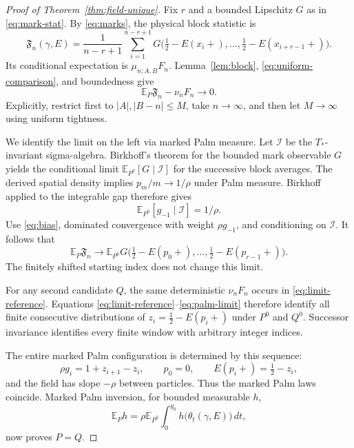 \documentclass[11pt,reqno]{amsart}
\theoremstyle{definition}
\theoremstyle{remark}
\newcommand{\E}{\mathbb E}
\newcommand{\1}{\mathbf 1}
\newcommand{\dd}{\,d}
\numberwithin{equation}{section}
\begin{document}
\begin{proof}[Proof of Theorem~\ref{thm:field-unique}]
Fix $r$ and a bounded Lipschitz $G$ as in \eqref{eq:mark-stat}.
By \eqref{eq:marks}, the physical block statistic is
\[
 \mathfrak F_n(\gamma,E)=\frac1{n-r+1}\sum_{i=1}^{n-r+1}
 G\big(\tfrac12-E(x_i+),\ldots,
       \tfrac12-E(x_{i+r-1}+ )\big).
\]
Its conditional expectation is $\mu_{n;A,B}F_n$.
Lemma~\ref{lem:block}, \eqref{eq:uniform-comparison}, and boundedness
give
\begin{equation}\label{eq:limit-reference}
 \E_P\mathfrak F_n-\nu_nF_n\longrightarrow0.
\end{equation}
Explicitly, restrict first to $|A|,|B-n|\le M$, take $n\to\infty$,
and then let $M\to\infty$ using uniform tightness.

We identify the limit on the left via marked Palm measure. Let
$\mathcal I$ be the $T_*$-invariant sigma-algebra. Birkhoff's theorem
for the bounded mark observable $G$ yields the conditional limit
$\E_{P^0}[G\mid\mathcal I]$ for the successive block averages.
The derived spatial density implies $p_m/m\to1/\rho$ under Palm
measure. Birkhoff applied to the integrable gap therefore gives
\[
 \E_{P^0}[g_{-1}\mid\mathcal I]=1/\rho.
\]
Use \eqref{eq:bias}, dominated convergence with weight $\rho g_{-1}$,
and conditioning on $\mathcal I$. It follows that
\begin{equation}\label{eq:palm-limit}
 \E_P\mathfrak F_n\longrightarrow
 \E_{P^0}G\big(\tfrac12-E(p_0+),\ldots,
              \tfrac12-E(p_{r-1}+ )\big).
\end{equation}
The finitely shifted starting index does not change this limit.

For any second candidate $Q$, the same deterministic $\nu_nF_n$ occurs
in \eqref{eq:limit-reference}. Equations
\eqref{eq:limit-reference}--\eqref{eq:palm-limit} therefore identify
all finite consecutive distributions of
$z_i=\tfrac12-E(p_i+)$ under $P^0$ and $Q^0$. Successor invariance
identifies every finite window with arbitrary integer indices.

The entire marked Palm configuration is determined by this sequence:
\begin{equation}\label{eq:reconstruct}
 \rho g_i=1+z_{i+1}-z_i,\qquad p_0=0,
 \qquad E(p_i+)=\tfrac12-z_i,
\end{equation}
and the field has slope $-\rho$ between particles. Thus the marked
Palm laws coincide. Marked Palm inversion, for bounded measurable $h$,
\[
 \E_Ph=\rho\E_{P^0}\int_0^{g_0}
 h\big(\theta_t(\gamma,E)\big)\dd t,
\]
now proves $P=Q$.
\end{proof}
\end{document}
